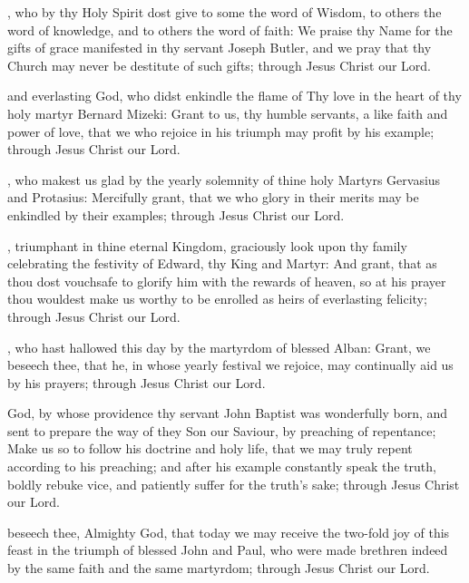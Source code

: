 , who by thy Holy Spirit dost give to some the word of Wisdom, to others the word of knowledge, and to others the word of faith: We praise thy Name for the gifts of grace manifested in thy servant Joseph Butler, and we pray that thy Church may never be destitute of such gifts; through Jesus Christ our Lord.

 and everlasting God, who didst enkindle the flame of Thy love in the heart of thy holy martyr Bernard Mizeki: Grant to us, thy humble servants, a like faith and power of love, that we who rejoice in his triumph may profit by his example; through Jesus Christ our Lord.

, who makest us glad by the yearly solemnity of thine holy Martyrs Gervasius and Protasius: Mercifully grant, that we who glory in their merits may be enkindled by their examples; through Jesus Christ our Lord.

, triumphant in thine eternal Kingdom, graciously look upon thy family celebrating the festivity of Edward, thy King and Martyr: And grant, that as thou dost vouchsafe to glorify him with the rewards of heaven, so at his prayer thou wouldest make us worthy to be enrolled as heirs of everlasting felicity; through Jesus Christ our Lord.

, who hast hallowed this day by the martyrdom of blessed Alban: Grant, we beseech thee, that he, in whose yearly festival we rejoice, may continually aid us by his prayers; through Jesus Christ our Lord.

 God, by whose providence thy servant John Baptist was wonderfully born, and sent to prepare the way of they Son our Saviour, by preaching of repentance; Make us so to follow his doctrine and holy life, that we may truly repent according to his preaching; and after his example constantly speak the truth, boldly rebuke vice, and patiently suffer for the truth's sake; through Jesus Christ our Lord.

 beseech thee, Almighty God, that today we may receive the two-fold joy of this feast in the triumph of blessed John and Paul, who were made brethren indeed by the same faith and the same martyrdom; through Jesus Christ our Lord.

